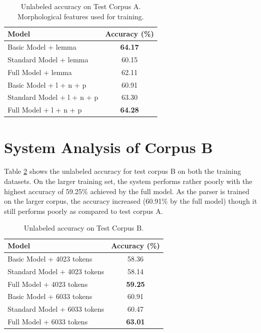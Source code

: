 \documentclass[11pt,letterpaper]{article}
\begin{document}
\begin{table}
\begin{center}
  \begin{tabular}{ l || c }
  \hline
  Model & Accuracy (\%)\\
  \hline
  Basic Model + lemma& \textbf{64.17} \\
  Standard Model + lemma& 60.15 \\
  Full Model + lemma& 62.11 \\
  \hline
  Basic Model + l + n + p& 60.91\\
  Standard Model + l + n + p& 63.30 \\
  Full Model + l + n + p& \textbf{64.28} \\
  \hline
   \end{tabular}
\end{center}
\caption{Unlabeled accuracy on Test Corpus A. Morphological features used for training.}
\label{Third}
\end{table}

\section{System Analysis of Corpus B}

Table \ref{Four} shows the unlabeled accuracy for test corpus B on both the training datasets. On the larger training set, the system performs rather poorly with the highest accuracy of 59.25\% achieved by the full model. As the parser is trained on the larger corpus, the accuracy increased (60.91\% by the full model) though it still performs poorly as compared to test corpus A. 

\begin{table}
\begin{center}
  \begin{tabular}{ l || c }
  \hline
  Model & Accuracy (\%)\\
  \hline
  Basic Model + 4023 tokens & 58.36 \\
  Standard Model + 4023 tokens & 58.14 \\
  Full Model + 4023 tokens & \textbf{59.25} \\
  \hline
  Basic Model + 6033 tokens & 60.91 \\
  Standard Model + 6033 tokens & 60.47 \\
  Full Model + 6033 tokens & \textbf{63.01}\\
  \hline
   \end{tabular}
\end{center}
\caption{Unlabeled accuracy on Test Corpus B.}
\label{Four}
\end{table}
\end{document}
